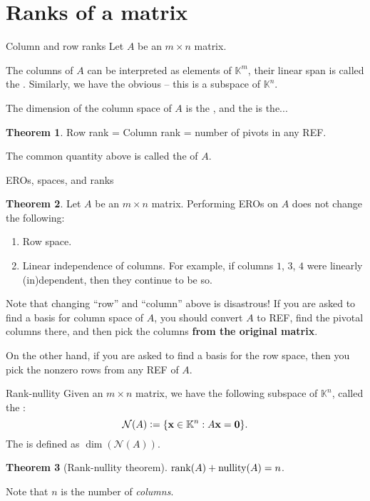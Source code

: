\documentclass[dvipsnames]{beamer}
\DeclareMathOperator{\nullity}{nullity}
\theoremstyle{definition}
\newtheorem{thm}{Theorem}
\begin{document}
\section{Ranks of a matrix}
\begin{frame}{Column and row ranks}
    Let $A$ be an $m \times n$ matrix. \pause 

    The columns of $A$ can be interpreted as elements of $\mathbb{K}^{m}$, \pause their linear span is called the . \pause \newline
    Similarly, we have the obvious  -- this is a subspace of $\mathbb{K}^{n}$. \pause

    The dimension of the column space of $A$ is the , and the  is the... \pause

    \begin{thm}
        Row rank = Column rank = number of pivots in any REF.
    \end{thm}

    The common quantity above is called the  of $A$.
\end{frame}
\begin{frame}{EROs, spaces, and ranks}
    \begin{thm}
        Let $A$ be an $m \times n$ matrix. Performing EROs on $A$ does not change the following: \pause
        \begin{enumerate}[<+->]
            \item Row space.
            \item Linear independence of columns. \pause For example, if columns $1$, $3$, $4$ were linearly (in)dependent, then they continue to be so. \pause
        \end{enumerate}
    \end{thm}

    Note that changing ``row'' and ``column'' above is disastrous! \pause If you are asked to find a basis for column space of $A$, \pause you should convert $A$ to REF, find the pivotal columns there, \pause and then pick the columns \textbf{from the original matrix}. \pause

    On the other hand, if you are asked to find a basis for the row space, then you pick the nonzero rows from any REF of $A$.
\end{frame}
\begin{frame}{Rank-nullity}
    Given an $m \times n$ matrix, we have the following subspace of $\mathbb{K}^{n}$, called the : \pause
    \begin{equation*} 
        \mathcal{N}(A) \vcentcolon= \{\mathbf{x} \in \mathbb{K}^{n} : A \mathbf{x} = \mathbf{0}\}.
    \end{equation*} \pause
    The  is defined as $\dim(\mathcal{N}(A))$. \pause

    \begin{thm}[Rank-nullity theorem]
        $\rank(A) + \nullity(A) = n$.   
    \end{thm} \pause

    Note that $n$ is the number of \emph{columns}.
\end{frame}
\end{document}
